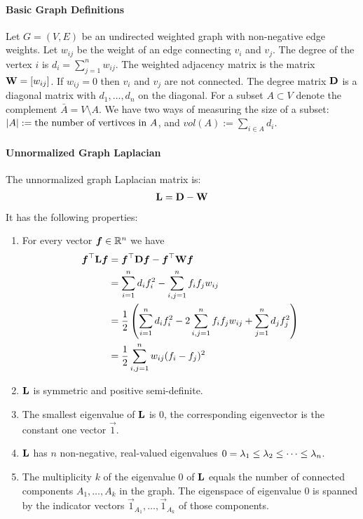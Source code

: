 \paragraph{Basic Graph Definitions}

Let $G=(V,E)$ be an undirected weighted graph with non-negative edge weights. Let $w_{ij}$ be the weight of an edge connecting $v_i$ and $v_j$. The degree of the vertex $i$ is $d_i=\sum_{j=1}^nw_{ij}$. The weighted adjacency matrix is the matrix $\mathbf{W}=[w_{ij}]$. If $w_{ij}=0$ then $v_i$ and $v_j$ are not connected. The degree matrix $\mathbf{D}$ is a diagonal matrix with $d_1,\dotsc,d_n$ on the diagonal. For a subset $A\subset V$ denote the complement $\bar{A}=V\setminus A$. We have two ways of measuring the size of a subset: $\left\vert A\right\vert:=\text{the number of vertivces in }A$, and $vol(A):=\sum_{i\in A}d_i$.

\paragraph{Unnormalized Graph Laplacian}

The unnormalized graph Laplacian matrix is:
\begin{align*}
\mathbf{L}=\mathbf{D}-\mathbf{W}
\end{align*}
It has the following properties:
\begin{enumerate}
	\item For every vector $\boldsymbol{f}\in\mathbb{R}^n$ we have
	\begin{align*}
	\boldsymbol{f}^\top\mathbf{L}\boldsymbol{f}&=\boldsymbol{f}^\top\mathbf{D}\boldsymbol{f}-\boldsymbol{f}^\top\mathbf{W}\boldsymbol{f} \\
	&=\sum_{i=1}^nd_if_i^2-\sum_{i,j=1}^nf_if_jw_{ij} \\
	&=\frac{1}{2}\left(\sum_{i=1}^nd_if_i^2-2\sum_{i,j=1}^nf_if_jw_{ij}+\sum_{j=1}^nd_jf_j^2\right) \\
	&=\frac{1}{2}\sum_{i,j=1}^nw_{ij}(f_i-f_j)^2
	\end{align*}
	\item $\mathbf{L}$ is symmetric and positive semi-definite.
	\item The smallest eigenvalue of $\mathbf{L}$ is 0, the corresponding eigenvector is the constant one vector $\vec{1}$.
	\item $\mathbf{L}$ has $n$ non-negative, real-valued eigenvalues $0=\lambda_1\leq\lambda_2\leq\cdots\leq\lambda_n$.
	\item The multiplicity $k$ of the eigenvalue 0 of $\mathbf{L}$ equals the number of connected components $A_1,\dotsc,A_k$ in the graph. The eigenspace of eigenvalue 0 is spanned by the indicator vectors $\vec{1}_{A_1},\dotsc,\vec{1}_{A_k}$ of those components.
\end{enumerate}

